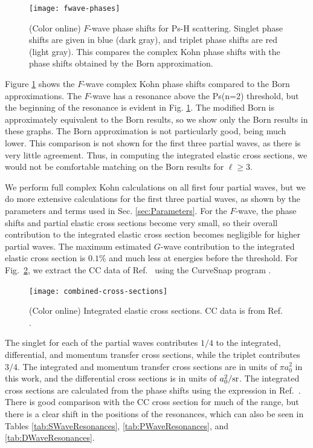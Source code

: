 \documentclass[preprint,showpacs,showkeys,preprintnumbers,amsmath,amssymb,longbibliography,pra,aps]{revtex4-1}
\begin{document}
\begin{figure}[H]
	\centering
	\texttt{[image: fwave-phases]}
	\caption{(Color online) $F$-wave phase shifts for Ps-H scattering.
Singlet phase shifts are given in blue
(dark gray), and triplet phase shifts are red (light gray). This compares the
complex Kohn phase shifts with the phase shifts obtained by the Born
approximation.}
	\label{fig:fwave-phases}
\end{figure}

Figure \ref{fig:fwave-phases} shows the $F$-wave
complex Kohn phase shifts compared to the Born approximations. The $F$-wave 
has a resonance above the Ps(n=2) threshold, but the beginning of the 
resonance is evident in Fig. \ref{fig:fwave-phases}. The modified Born is
approximately equivalent to the Born results, so we show only the Born results
in these graphs. The Born approximation is not particularly good, being 
much lower. This comparison is not shown for 
the first three partial waves, as there is very little agreement. Thus, in
computing the integrated elastic cross sections, we would not be comfortable
matching on the Born results for $\ell \geq 3$.

We perform full complex Kohn calculations on all first four partial waves, but 
we do more extensive calculations for the first three partial waves, as shown 
by the parameters and terms used in Sec. \ref{sec:Parameters}. For the
$F$-wave, the phase shifts and partial elastic cross 
sections become very small, so their overall contribution to the integrated 
elastic cross section becomes negligible for higher partial waves.
The maximum estimated $G$-wave contribution to the integrated elastic cross
section is $0.1\%$ and much less at energies before the threshold.
For Fig.~\ref{fig:combined-cross-sections}, we extract the CC data of
Ref.~\cite{Walters2004} using the CurveSnap program \cite{CurveSnap}.

\begin{figure}[H]
	\centering
	\texttt{[image: combined-cross-sections]}
	\caption{(Color online) Integrated elastic cross sections. CC data is from
Ref. \cite{Walters2004}.}
	\label{fig:combined-cross-sections}
\end{figure}

The singlet for each of the partial waves contributes $1/4$ to the integrated,
differential, and momentum transfer cross sections, while the triplet
contributes $3/4$. The integrated and momentum transfer cross sections are
in units of $\pi a_0^2$ in this work, and the differential cross
sections is in units of $a_0^2 / \rm{sr}$.
The integrated cross sections are calculated
from the phase shifts using the expression in Ref.~\cite{Bransden2003}.
There is good comparison with the 
CC cross section \cite{Walters2004} for much of the range, but there is a 
clear shift in the positions of the resonances, which can also be seen in 
Tables \ref{tab:SWaveResonances}, \ref{tab:PWaveResonances}, and
\ref{tab:DWaveResonances}.
\end{document}
